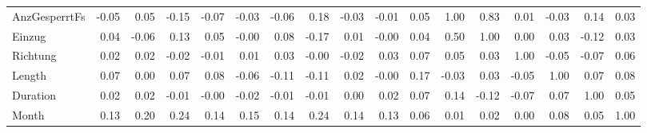 \begin{tabular}{lrrrrrrrrrrrrrrrr}
AnzGesperrtFs &    -0.05 &     0.05 &    -0.15 &    -0.07 &     -0.03 &     -0.06 &      0.18 &  -0.03 &  -0.01 &     0.05 &           1.00 &    0.83 &      0.01 &   -0.03 &      0.14 &   0.03 \\
Einzug        &     0.04 &    -0.06 &     0.13 &     0.05 &     -0.00 &      0.08 &     -0.17 &   0.01 &  -0.00 &     0.04 &           0.50 &    1.00 &      0.00 &    0.03 &     -0.12 &   0.03 \\
Richtung      &     0.02 &     0.02 &    -0.02 &    -0.01 &      0.01 &      0.03 &     -0.00 &  -0.02 &   0.03 &     0.07 &           0.05 &    0.03 &      1.00 &   -0.05 &     -0.07 &   0.06 \\
Length        &     0.07 &     0.00 &     0.07 &     0.08 &     -0.06 &     -0.11 &     -0.11 &   0.02 &  -0.00 &     0.17 &          -0.03 &    0.03 &     -0.05 &    1.00 &      0.07 &   0.08 \\
Duration      &     0.02 &     0.02 &    -0.01 &    -0.00 &     -0.02 &     -0.01 &     -0.01 &   0.00 &   0.02 &     0.07 &           0.14 &   -0.12 &     -0.07 &    0.07 &      1.00 &   0.05 \\
Month         &     0.13 &     0.20 &     0.24 &     0.14 &      0.15 &      0.14 &      0.24 &   0.14 &   0.13 &     0.06 &           0.01 &    0.02 &      0.00 &    0.08 &      0.05 &   1.00 \\
\bottomrule
\end{tabular}
